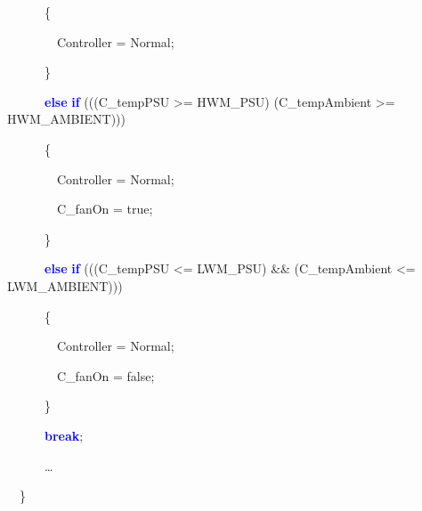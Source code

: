 \documentclass[a4paper]{article}
\begin{document}
{\ttfamily
\ \ \ \ \ \ \{}

{\ttfamily
\ \ \ \ \ \ \ \ Controller = Normal;}

{\ttfamily
\ \ \ \ \ \ \}}

{\ttfamily
\ \ \ \ \ \ \textbf{\textcolor{blue}{else}}
\textbf{\textcolor{blue}{if}} (((C\_tempPSU {\textgreater}= HWM\_PSU)
{\textbar}{\textbar} (C\_tempAmbient {\textgreater}= HWM\_AMBIENT)))}

{\ttfamily
\ \ \ \ \ \ \{}

{\ttfamily
\ \ \ \ \ \ \ \ Controller = Normal;}

{\ttfamily
\ \ \ \ \ \ \ \ C\_fanOn = true;}

{\ttfamily
\ \ \ \ \ \ \}}

{\ttfamily
\ \ \ \ \ \ \textbf{\textcolor{blue}{else}}
\textbf{\textcolor{blue}{if}} (((C\_tempPSU {\textless}= LWM\_PSU) \&\&
(C\_tempAmbient {\textless}= LWM\_AMBIENT)))}

{\ttfamily
\ \ \ \ \ \ \{}

{\ttfamily
\ \ \ \ \ \ \ \ Controller = Normal;}

{\ttfamily
\ \ \ \ \ \ \ \ C\_fanOn = false;}

{\ttfamily
\ \ \ \ \ \ \}}

{\ttfamily
\ \ \ \ \ \ \textbf{\textcolor{blue}{break}};}

{\ttfamily
\ \ \ \ \ \ {\dots} }

{\ttfamily
\ \ \}}
\end{document}
